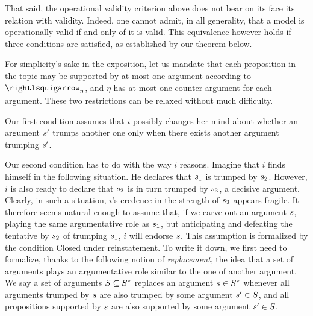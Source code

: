 \documentclass[version=3.21, pagesize, twoside=off, bibliography=totoc, DIV=calc, fontsize=12pt, a4paper, french, english]{scrartcl}
\begin{document}
That said, the operational validity criterion above does not bear on its face its relation with validity. 
Indeed, one cannot admit, in all generality, that a model is operationally valid if and only of it is valid. 
This equivalence however holds if three conditions are satisfied, as established by our theorem below.

For simplicity's sake in the exposition, let us mandate that each proposition in the topic may be supported by at most one argument according to $\mleadsto$, and $\eta$ has at most one counter-argument for each argument. 
These two restrictions can be relaxed without much difficulty.

Our first condition assumes that $i$ possibly changes her mind about whether an argument $s'$ trumps another one only when there exists another argument trumping $s'$. 


Our second condition has to do with the way $i$ reasons. 
Imagine that $i$ finds himself in the following situation. 
He declares that $s_1$ is trumped by $s_2$. 
However, $i$ is also ready to declare that $s_2$ is in turn trumped by $s_3$, a decisive argument. 
Clearly, in such a situation, $i$'s credence in the strength of $s_2$ appears fragile. 
It therefore seems natural enough to assume that, if we carve out an argument $s$, playing the same argumentative role as $s_1$, but anticipating and defeating the tentative by $s_2$ of trumping $s_1$, $i$ will endorse $s$. 
This assumption is formalized by the condition Closed under reinstatement.%
To write it down, we first need to formalize, thanks to the following notion of \emph{replacement}, the idea that a set of arguments plays an argumentative role similar to the one of another argument. 
We say a set of arguments $S \subseteq S^*$ replaces an argument $s \in S^*$ whenever all arguments trumped by $s$ are also trumped by some argument $s' \in S$, and all propositions supported by $s$ are also supported by some argument $s' \in S$. 
	
\end{document}
